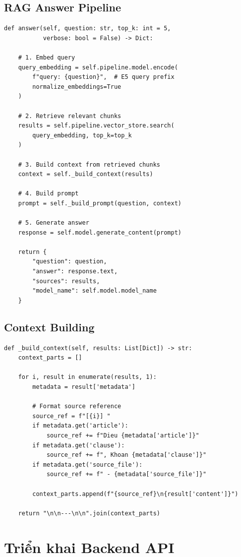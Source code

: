 \documentclass[../DoAn.tex]{subfiles}
\begin{document}
\subsection{RAG Answer Pipeline}
\begin{verbatim}
def answer(self, question: str, top_k: int = 5, 
           verbose: bool = False) -> Dict:
    
    # 1. Embed query
    query_embedding = self.pipeline.model.encode(
        f"query: {question}",  # E5 query prefix
        normalize_embeddings=True
    )
    
    # 2. Retrieve relevant chunks
    results = self.pipeline.vector_store.search(
        query_embedding, top_k=top_k
    )
    
    # 3. Build context from retrieved chunks
    context = self._build_context(results)
    
    # 4. Build prompt
    prompt = self._build_prompt(question, context)
    
    # 5. Generate answer
    response = self.model.generate_content(prompt)
    
    return {
        "question": question,
        "answer": response.text,
        "sources": results,
        "model_name": self.model.model_name
    }
\end{verbatim}

\subsection{Context Building}
\begin{verbatim}
def _build_context(self, results: List[Dict]) -> str:
    context_parts = []
    
    for i, result in enumerate(results, 1):
        metadata = result['metadata']
        
        # Format source reference
        source_ref = f"[{i}] "
        if metadata.get('article'):
            source_ref += f"Dieu {metadata['article']}"
        if metadata.get('clause'):
            source_ref += f", Khoan {metadata['clause']}"
        if metadata.get('source_file'):
            source_ref += f" - {metadata['source_file']}"
        
        context_parts.append(f"{source_ref}\n{result['content']}")
    
    return "\n\n---\n\n".join(context_parts)
\end{verbatim}

\section{Triển khai Backend API}
\end{document}
